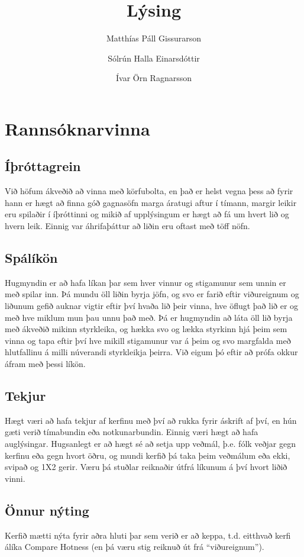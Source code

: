 \documentclass[a4paper,11pt]{article}
\title{Lýsing} \author{Matthías Páll Gissurarson  \and Sólrún Halla Einarsdóttir \and Ívar Örn Ragnarsson}
\begin{document}
\maketitle
\section{Rannsóknarvinna}
\subsection{Íþróttagrein}
Við höfum ákveðið að vinna með körfubolta, en það er helst
vegna þess að fyrir hann er hægt að finna góð gagnasöfn marga áratugi
aftur í tímann, margir leikir eru spilaðir í íþróttinni og mikið af
upplýsingum er hægt að fá um hvert lið og hvern leik. Einnig var
áhrifaþáttur að liðin eru oftast með töff nöfn.

\subsection{Spálíkön}
Hugmyndin er að hafa líkan þar sem hver vinnur og stigamunur sem unnin
er með spilar inn. Þá mundu öll liðin byrja jöfn, og svo er farið
eftir viðureignum og liðunum gefið auknar vigtir eftir því hvaða lið
þeir vinna, hve öflugt það lið er og með hve miklum mun þau unnu það
með. Þá er hugmyndin að láta öll lið byrja með ákveðið mikinn
styrkleika, og hækka svo og lækka styrkinn hjá þeim sem vinna og tapa
eftir því hve mikill stigamunur var á þeim og svo margfalda með
hlutfallinu á milli núverandi styrkleikja þeirra. Við eigum þó eftir
að prófa okkur áfram með þessi líkön.

\subsection{Tekjur}
Hægt væri að hafa tekjur af kerfinu með því að rukka fyrir áskrift af
því, en hún gæti verið tímabundin eða notkunarbundin. Einnig væri hægt
að hafa auglýsingar. Hugsanlegt er að hægt sé að setja upp veðmál,
þ.e. fólk veðjar gegn kerfinu eða gegn hvort öðru, og mundi kerfið þá
taka þeim veðmálum eða ekki, svipað og 1X2 gerir. Væru þá stuðlar
reiknaðir útfrá líkunum á því hvort liðið vinni.

\subsection{Önnur nýting}
Kerfið mætti nýta fyrir aðra hluti þar sem verið er að keppa,
t.d. eitthvað kerfi álíka Compare Hotness (en þá væru stig reiknuð út
frá ``viðureignum'').
\end{document}
